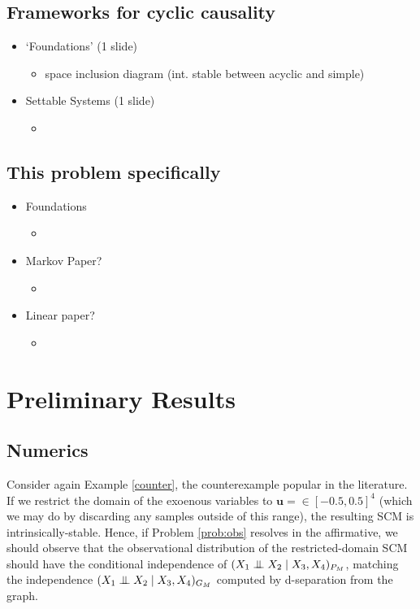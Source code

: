 \documentclass[letterpaper,10pt]{article}
\newcommand{\CI}{\mathrel{\perp\mspace{-10mu}\perp}}
\begin{document}
\subsection{Frameworks for cyclic causality}
\begin{itemize}
  \item `Foundations' \color{blue} (1 slide)\color{black}
  \begin{itemize}
    \item space inclusion diagram (int. stable between acyclic and simple)
  \end{itemize}

  \item Settable Systems \color{blue} (1 slide)\color{black}
  \begin{itemize}
    \item 
  \end{itemize}
\end{itemize}

\subsection{This problem specifically}
\begin{itemize}
  \item Foundations
  \begin{itemize}
    \item 
  \end{itemize}

  \item Markov Paper?
  \begin{itemize}
    \item 
  \end{itemize}

  \item Linear paper?
  \begin{itemize}
    \item 
  \end{itemize}
\end{itemize}


\section{Preliminary Results}
\subsection{Numerics}

Consider again Example \ref{counter}, the counterexample popular in the literature. If we restrict the domain of the exoenous variables to $\mathbf{u}=\in [-0.5,0.5]^4$ (which we may do by discarding any samples outside of this range), the resulting SCM is intrinsically-stable. Hence, if Problem \ref{prob:obs} resolves in the affirmative, we should observe that the observational distribution of the restricted-domain SCM should have the conditional independence of $(X_1 \CI X_2 \mid X_3,X_4)_{P_M}$, matching the independence $(X_1 \CI X_2 \mid X_3,X_4)_{G_M}$ computed by d-separation from the graph.
\end{document}
